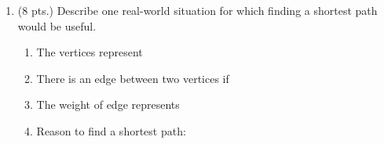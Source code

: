 \documentclass[12pt]{article}
\begin{document}
\begin{enumerate}
\begin{enumerate}
shortest path: \underline{\hspace{2in}} \hspace{0.5in} total weight: \underline{\hspace{2in}}\\

\vfill
\item (8 pts.) Describe one real-world situation for which finding a shortest path would be useful.\\

	\begin{enumerate}
	\item The vertices represent \hrulefill \\
	\vfill

	\item There is an edge between two vertices if \hrulefill\\
	\vfill

	\item The weight of edge represents \hrulefill\\
	\vfill

	\item Reason to find a shortest path:
	
	


\end{enumerate}
\end{enumerate}
\end{enumerate}
\end{document}
